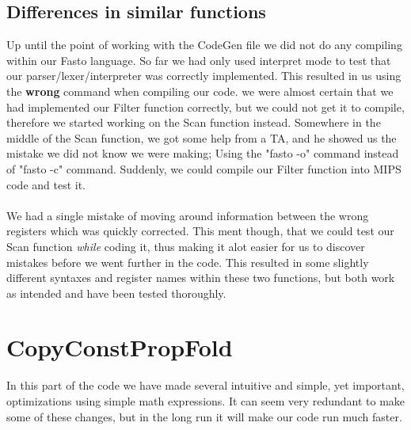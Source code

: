 \documentclass[12pt]{article}
\begin{document}
\subsection{Differences in similar functions}
Up until the point of working with the CodeGen file we did not do any compiling within our Fasto language. So far we had only used interpret mode to test that our parser/lexer/interpreter was correctly implemented. This resulted in us using the \textbf{wrong} command when compiling our code. we were almost certain that we had implemented our Filter function correctly, but we could not get it to compile, therefore we started working on the Scan function instead. Somewhere in the middle of the Scan function, we got some help from a TA, and he showed us the mistake we did not know we were making; Using the "fasto -o" command instead of "fasto -c" command. Suddenly, we could compile our Filter function into MIPS code and test it.\\\\ 
We had a single mistake of moving around information between the wrong registers which was quickly corrected. This ment though, that we could test our Scan function \textit{while} coding it, thus making it alot easier for us to discover mistakes before we went further in the code. This resulted in some slightly different syntaxes and register names within these two functions, but both work as intended and have been tested thoroughly. 

\section{CopyConstPropFold}
In this part of the code we have made several intuitive and simple, yet important, optimizations using simple math expressions. It can seem very redundant to make some of these changes, but in the long run it will make our code run much faster.
\end{document}
